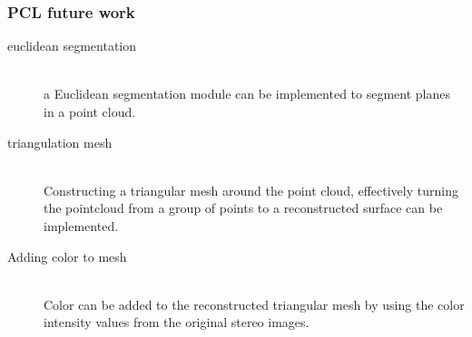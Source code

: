 \subsubsection{PCL future work}
\begin{description}
\item[euclidean segmentation]\hfill \\
a Euclidean segmentation module can be implemented to segment planes in a point cloud.
\item[triangulation mesh]\hfill \\
Constructing a triangular mesh around the point cloud, effectively turning the pointcloud from a group of points to a reconstructed surface can be implemented.
\item[Adding color to mesh]\hfill \\
Color can be added to the reconstructed triangular mesh by using the color intensity values from the original stereo images.
\end{description}



